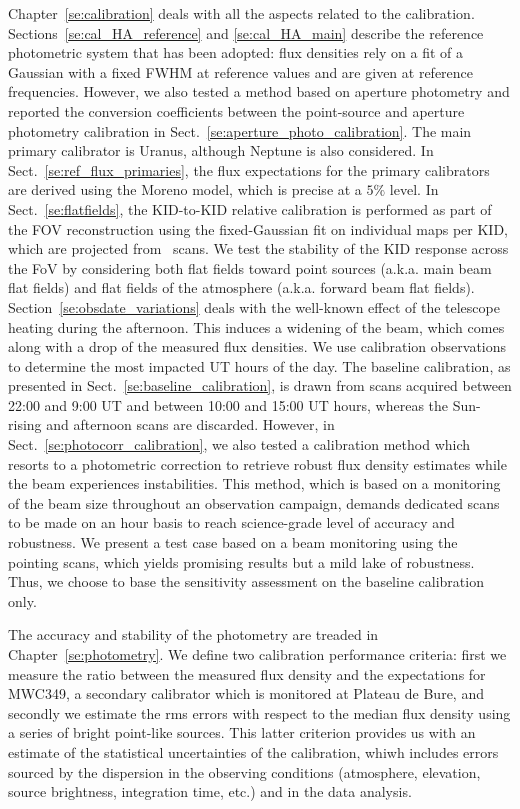 Chapter~\ref{se:calibration} deals with all the aspects related to the
calibration. Sections~\ref{se:cal_HA_reference}
and \ref{se:cal_HA_main} describe the reference photometric system
that has been adopted: flux densities rely on a fit
of a Gaussian with a fixed FWHM at reference values and are given at
reference frequencies. However, we also tested a method based on aperture
photometry and reported the conversion coefficients between the
point-source and aperture photometry calibration in
Sect.~\ref{se:aperture_photo_calibration}.
The main primary calibrator is Uranus, although Neptune
is also considered. In Sect.~\ref{se:ref_flux_primaries}, the flux
expectations for the primary calibrators are derived using the Moreno
model, which is precise at a $5\%$ level. In
Sect.~\ref{se:flatfields}, the KID-to-KID relative calibration is
performed as part of the FOV reconstruction using the fixed-Gaussian fit on
individual maps per KID, which are projected from \bm\ scans. We test
the stability of the KID response across the FoV by considering both
flat fields toward point sources (a.k.a. main beam flat fields) and
flat fields of the atmosphere (a.k.a. forward beam flat
fields). Section~\ref{se:obsdate_variations} deals with the well-known
effect of the telescope heating during the afternoon. This induces a
widening of the beam, which comes along with a drop of the measured
flux densities. We use calibration observations to determine the most
impacted UT hours of the day. The baseline calibration, as presented
in Sect.~\ref{se:baseline_calibration}, is drawn from
scans acquired between 22:00 and 9:00 UT and between 10:00 and 15:00
UT hours, whereas the Sun-rising and afternoon scans are
discarded. However, in Sect.~\ref{se:photocorr_calibration}, we also
tested a calibration method which resorts to a photometric correction
to retrieve robust flux density estimates while the beam experiences
instabilities. This method, which is based on a monitoring of the beam
size throughout an observation campaign, demands dedicated scans to be
made on an hour basis to reach science-grade level of accuracy and
robustness. We present a test case based on a beam monitoring using
the pointing scans, which yields promising results but a mild lake of
robustness. Thus, we choose to base the sensitivity assessment on the
baseline calibration only.

The accuracy and stability of the photometry are treaded in
Chapter~\ref{se:photometry}. We define two calibration performance
criteria: first we measure the ratio between the measured flux density
and the expectations for MWC349, a secondary calibrator which is
monitored at Plateau de Bure, and secondly we estimate the rms errors
with respect to the median flux density using a series of bright
point-like sources. This latter criterion provides us with an estimate
of the statistical uncertainties of the calibration, whiwh includes
errors sourced by the dispersion in the observing conditions
(atmosphere, elevation, source brightness, integration time, etc.) and
in the data analysis.

